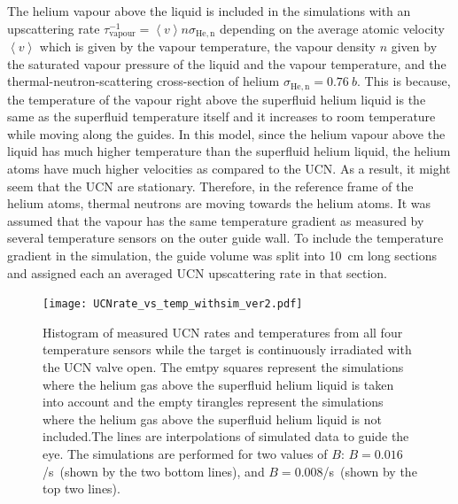 The helium vapour above the liquid is included in the simulations with
an upscattering rate
$\tau^{-1}_\mathrm{vapour} = \left< v \right> n \sigma_\mathrm{He,n}$
depending on the average atomic velocity $\left < v \right>$ which is
given by the vapour temperature, the vapour density $n$ given by the
saturated vapour pressure of the liquid and the vapour temperature,
and the thermal-neutron-scattering cross-section of helium
$\sigma_\mathrm{He,n} = 0.76~b$. This is because, the temperature of
the vapour right above the superfluid helium liquid is the same as the
superfluid temperature itself and it increases to room temperature
while moving along the guides. In this model, since the helium vapour
above the liquid has much higher temperature than the superfluid
helium liquid, the helium atoms have much higher velocities as
compared to the UCN. As a result, it might seem that the UCN are
stationary. Therefore, in the reference frame of the helium atoms,
thermal neutrons are moving towards the helium atoms.  It was assumed
that the vapour has the same temperature gradient as measured by
several temperature sensors on the outer guide wall. To include the
temperature gradient in the simulation, the guide volume was split
into 10~cm long sections and assigned each an averaged UCN
upscattering rate in that section.



\begin{figure}[h!]
  \centering
  \texttt{[image: UCNrate\_vs\_temp\_withsim\_ver2.pdf]}
  \caption[UCN rate versus superfluid helium temperature data and
  simulations]{Histogram of measured UCN rates and temperatures from
    all four temperature sensors while the target is continuously
    irradiated with the UCN valve open. The emtpy squares represent
    the simulations where the helium gas above the superfluid helium
    liquid is taken into account and the empty tirangles represent the
    simulations where the helium gas above the superfluid helium
    liquid is not included.The lines are interpolations of simulated
    data to guide the eye. The simulations are performed for two
    values of $B$: $B = 0.016$/s~(shown by the two bottom lines), and
    $B = 0.008$/s~(shown by the top two lines). }
  \label{fig:rate_vs_temp_sim}
\end{figure}


